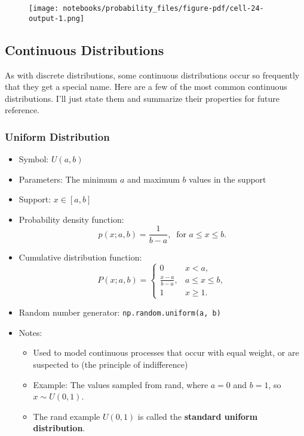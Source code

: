 \documentclass[
  letterpaper,
  DIV=11,
  numbers=noendperiod]{scrreprt}
\providecommand{\tightlist}{%
  \setlength{\itemsep}{0pt}\setlength{\parskip}{0pt}}\usepackage{longtable,booktabs,array}
\begin{document}
\begin{figure}[H]

{\centering \texttt{[image: notebooks/probability\_files/figure-pdf/cell-24-output-1.png]}

}

\end{figure}

\hypertarget{continuous-distributions}{%
\subsection{Continuous Distributions}\label{continuous-distributions}}

As with discrete distributions, some continuous distributions occur so
frequently that they get a special name. Here are a few of the most
common continuous distributions. I'll just state them and summarize
their properties for future reference.

\hypertarget{uniform-distribution}{%
\subsubsection{Uniform Distribution}\label{uniform-distribution}}

\begin{itemize}
\tightlist
\item
  Symbol: \(U(a,b)\)
\item
  Parameters: The minimum \(a\) and maximum \(b\) values in the support
\item
  Support: \(x \in [a,b]\)
\item
  Probability density function:
  \[p(x; a,b) = \frac{1}{b-a}, \ \text{ for } a \leq x \leq b.\]
\item
  Cumulative distribution function: \[
  P(x; a, b) = 
  \begin{cases}
  0 & x < a, \\
  \frac{x - a}{b-a}, & a \leq x \leq b, \\
  1 & x \geq 1.
  \end{cases}
  \]
\item
  Random number generator: \texttt{np.random.uniform(a,\ b)}
\item
  Notes:

  \begin{itemize}
  \tightlist
  \item
    Used to model continuous processes that occur with equal weight, or
    are suspected to (the principle of indifference)
  \item
    Example: The values sampled from rand, where \(a=0\) and \(b=1\), so
    \(x \sim U(0,1)\).
  \item
    The rand example \(U(0,1)\) is called the \textbf{standard uniform
    distribution}.
  \end{itemize}
\end{itemize}
\end{document}
